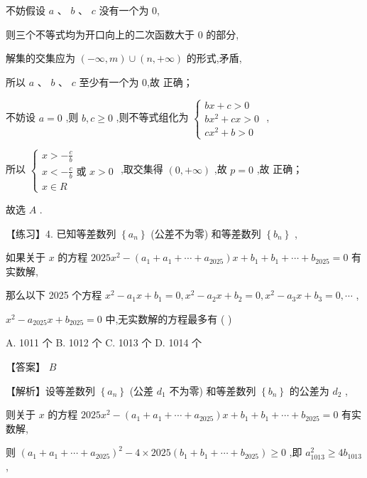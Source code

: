 \documentclass[10pt]{article}
\newcommand*\circled[1]{\tikz[baseline=(char.base)]{\node[shape=circle,draw,inner sep=1.5pt] (char) {\small #1};}}
\begin{document}
不妨假设 \(a\text{ 、 }b\text{ 、 }c\) 没有一个为 0,

则三个不等式均为开口向上的二次函数大于 0 的部分,

解集的交集应为 \(\left( {-\infty ,m}\right)  \cup  \left( {n, + \infty }\right)\) 的形式,矛盾,

所以 \(a\text{ 、 }b\text{ 、 }c\) 至少有一个为 0,故 \circled{1} 正确；

不妨设 \(a = 0\) ,则 \(b,c \geq  0\) ,则不等式组化为 \(\left\{  \begin{array}{l} {bx} + c > 0 \\  b{x}^{2} + {cx} > 0 \\  c{x}^{2} + b > 0 \end{array}\right.\) ,

所以 \(\left\{  \begin{array}{l} x >  - \frac{c}{b} \\  x <  - \frac{c}{b}\text{ 或 }x > 0 \\  x \in  R \end{array}\right.\) ,取交集得 \(\left( {0, + \infty }\right)\) ,故 \(p = 0\) ,故 \circled{2} 正确；

故选 \(A\) .

【练习】4. 已知等差数列 \(\left\{  {a}_{n}\right\}\) (公差不为零) 和等差数列 \(\left\{  {b}_{n}\right\}\) ,

如果关于 \(x\) 的方程 \({2025}{x}^{2} - \left( {{a}_{1} + {a}_{1} + \cdots  + {a}_{2025}}\right) x + {b}_{1} + {b}_{1} + \cdots  + {b}_{2025} = 0\) 有实数解,

那么以下 2025 个方程 \({x}^{2} - {a}_{1}x + {b}_{1} = 0,{x}^{2} - {a}_{2}x + {b}_{2} = 0,{x}^{2} - {a}_{3}x + {b}_{3} = 0,\cdots\) ,

\({x}^{2} - {a}_{2025}x + {b}_{2025} = 0\) 中,无实数解的方程最多有 ( )

A. 1011 个 B. 1012 个 C. 1013 个 D. 1014 个

【答案】 \(B\)

【解析】设等差数列 \(\left\{  {a}_{n}\right\}\) (公差 \({d}_{1}\) 不为零) 和等差数列 \(\left\{  {b}_{n}\right\}\) 的公差为 \({d}_{2}\) ,

则关于 \(x\) 的方程 \({2025}{x}^{2} - \left( {{a}_{1} + {a}_{1} + \cdots  + {a}_{2025}}\right) x + {b}_{1} + {b}_{1} + \cdots  + {b}_{2025} = 0\) 有实数解,

则 \({\left( {a}_{1} + {a}_{1} + \cdots  + {a}_{2025}\right) }^{2} - 4 \times  {2025}\left( {{b}_{1} + {b}_{1} + \cdots  + {b}_{2025}}\right)  \geq  0\) ,即 \({a}_{1013}^{2} \geq  4{b}_{1013}\) ,
\end{document}
